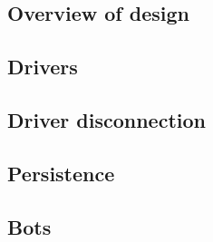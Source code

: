 \subsection{Overview of design}
\label{server-impl:overview}


\subsection{Drivers}
\label{sec:server-impl:drivers}


\subsection{Driver disconnection}
\label{sec:server-impl:driver-disconnection}



\subsection{Persistence}
\label{sec:server-impl:persistence}


\subsection{Bots}
\label{sec:server-impl:bots}

